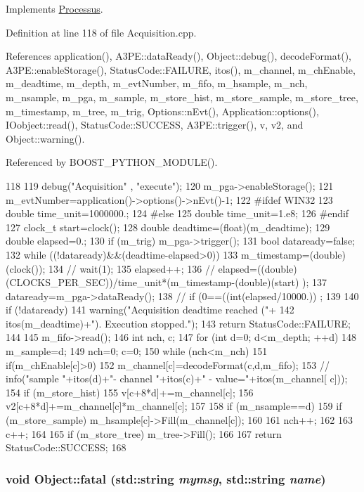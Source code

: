 Implements \hyperlink{classProcessus_a63767a63a1fb0055c5aa45b21a4a5d58}{Processus}.

Definition at line 118 of file Acquisition.cpp.

References application(), A3PE::dataReady(), Object::debug(), decodeFormat(), A3PE::enableStorage(), StatusCode::FAILURE, itos(), m\_\-channel, m\_\-chEnable, m\_\-deadtime, m\_\-depth, m\_\-evtNumber, m\_\-fifo, m\_\-hsample, m\_\-nch, m\_\-nsample, m\_\-pga, m\_\-sample, m\_\-store\_\-hist, m\_\-store\_\-sample, m\_\-store\_\-tree, m\_\-timestamp, m\_\-tree, m\_\-trig, Options::nEvt(), Application::options(), IOobject::read(), StatusCode::SUCCESS, A3PE::trigger(), v, v2, and Object::warning().

Referenced by BOOST\_\-PYTHON\_\-MODULE().


\begin{DoxyCode}
118                                   {
119   debug("Acquisition" , "execute");
120   m_pga->enableStorage();
121   m_evtNumber=application()->options()->nEvt()-1;
122 #ifdef WIN32
123     double time_unit=1000000.;
124 #else
125     double time_unit=1.e8;
126 #endif
127   clock_t start=clock();
128   double deadtime=(float)(m_deadtime);
129   double elapsed=0.;
130   if (m_trig) {m_pga->trigger();}
131   bool dataready=false;
132   while ((!dataready)&&(deadtime-elapsed>0)){    
133       m_timestamp=(double)(clock());
134 //      wait(1);
135       elapsed++;
136 //      elapsed=((double)(CLOCKS_PER_SEC))/time_unit*(m_timestamp-(double)(start)
      );
137       dataready=m_pga->dataReady();
138 //      if (0==((int(elapsed/10000.))%
      ;
139   }
140   if (!dataready){
141     warning("Acquisition deadtime reached ("+
142         itos(m_deadtime)+"). Execution stopped.");
143     return StatusCode::FAILURE;
144   }
145   m_fifo->read();
146   int nch, c;
147   for (int d=0; d<m_depth; ++d){
148     m_sample=d;
149     nch=0; c=0;
150     while (nch<m_nch) {
151       if(m_chEnable[c]>0){
152         m_channel[c]=decodeFormat(c,d,m_fifo);
153 //        info("sample "+itos(d)+"- channel "+itos(c)+" - value="+itos(m_channel[
      c]));
154         if (m_store_hist) {
155           v[c+8*d]+=m_channel[c];
156           v2[c+8*d]+=m_channel[c]*m_channel[c];
157         }
158         if (m_nsample==d){
159           if (m_store_sample) m_hsample[c]->Fill(m_channel[c]);
160         }
161         nch++;
162       }
163       c++;
164     }
165     if (m_store_tree) m_tree->Fill();
166   }
167   return StatusCode::SUCCESS;
168 }
\end{DoxyCode}
\hypertarget{classObject_ae62acd3d09f716220f75f252dc38bc9a}{
\subsubsection[{fatal}]{\setlength{\rightskip}{0pt plus 5cm}void Object::fatal (std::string {\em mymsg}, \/  std::string {\em name})}}
\label{classObject_ae62acd3d09f716220f75f252dc38bc9a}


